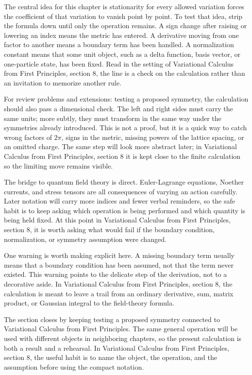 The central idea for this chapter is stationarity for every allowed variation forces the coefficient of that variation to vanish point by point.  To test that idea, strip the formula down until only the operation remains.  A sign change after raising or lowering an index means the metric has entered.  A derivative moving from one factor to another means a boundary term has been handled.  A normalization constant means that some unit object, such as a delta function, basis vector, or one-particle state, has been fixed.  Read in the setting of Variational Calculus from First Principles, section 8, the line is a check on the calculation rather than an invitation to memorize another rule.

For review problems and extensions: testing a proposed symmetry, the calculation should also pass a dimensional check.  The left and right sides must carry the same units; more subtly, they must transform in the same way under the symmetries already introduced.  This is not a proof, but it is a quick way to catch wrong factors of \(2\pi\), signs in the metric, missing powers of the lattice spacing, or an omitted charge.  The same step will look more abstract later; in Variational Calculus from First Principles, section 8 it is kept close to the finite calculation so the limiting move remains visible.

The bridge to quantum field theory is direct.  Euler-Lagrange equations, Noether currents, and stress tensors are all consequences of varying an action carefully.  Later notation will carry more indices and fewer verbal reminders, so the safe habit is to keep asking which operation is being performed and which quantity is being held fixed.  At this point in Variational Calculus from First Principles, section 8, it is worth asking what would fail if the boundary condition, normalization, or symmetry assumption were changed.

One warning is worth making explicit here.  A missing boundary term usually means that a boundary condition has been assumed, not that the term never existed.  This warning points to the delicate step of the derivation, not to a decorative aside.  In Variational Calculus from First Principles, section 8, the calculation is meant to leave a trail from an ordinary derivative, sum, matrix product, or Gaussian integral to the field-theory formula.

The section closes by keeping testing a proposed symmetry connected to Variational Calculus from First Principles.  The same general operation will be used with different objects in neighboring chapters, so the present calculation is both a result and a rehearsal.  In Variational Calculus from First Principles, section 8, the useful habit is to name the object, the operation, and the assumption before using the compact notation.



